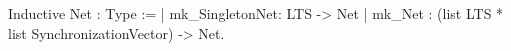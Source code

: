 Inductive Net : Type :=
  | mk_SingletonNet: LTS -> Net
  | mk_Net         : (list LTS * list SynchronizationVector) -> Net.